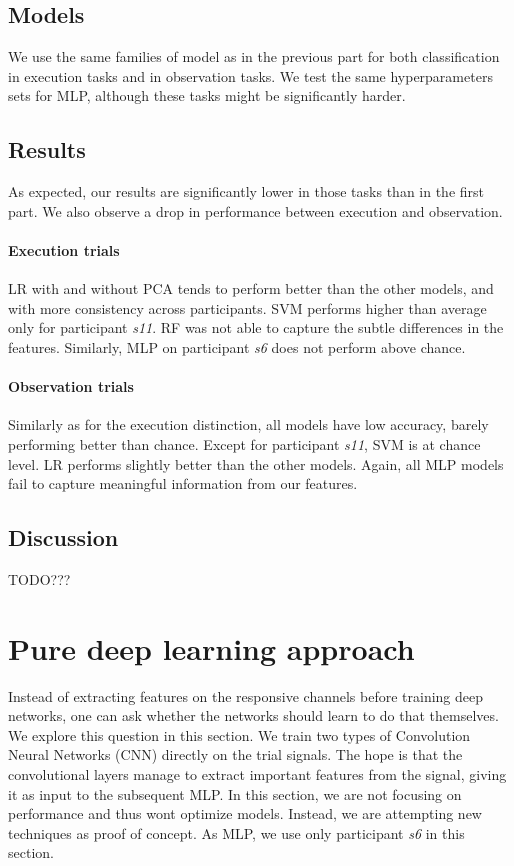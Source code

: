 \documentclass[10pt,conference,compsocconf]{IEEEtran}
\begin{document}
\subsection{Models}
We use the same families of model as in the previous part for both classification in execution tasks and in observation tasks. We test the same hyperparameters sets for MLP, although these tasks might be significantly harder.

\subsection{Results}
As expected, our results are significantly lower in those tasks than in the first part. We also observe a drop in performance between execution and observation.

\paragraph{Execution trials}
LR with and without PCA tends to perform better than the other models, and with more consistency across participants. SVM performs higher than average only for participant \textit{s11}. RF was not able to capture the subtle differences in the features. Similarly, MLP on participant \textit{s6} does not perform above chance.

\paragraph{Observation trials}
Similarly as for the execution distinction, all models have low accuracy, barely performing better than chance. Except for participant \textit{s11}, SVM is at chance level. LR performs slightly better than the other models. Again, all MLP models fail to capture meaningful information from our features.

\subsection{Discussion}
TODO???

\section{Pure deep learning approach}
\label{sec:deeplearning}
Instead of extracting features on the responsive channels before training deep networks, one can ask whether the networks should learn to do that themselves. We explore this question in this section. We train two types of Convolution Neural Networks (CNN) directly on the trial signals. The hope is that the convolutional layers manage to extract important features from the signal, giving it as input to the subsequent MLP. In this section, we are not focusing on performance and thus wont optimize models. Instead, we are attempting new techniques as proof of concept. As MLP, we use only participant \textit{s6} in this section.
\end{document}
